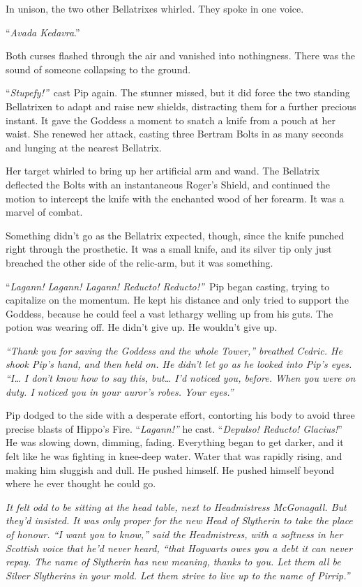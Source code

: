In unison, the two other Bellatrixes whirled. They spoke in one voice.

``\emph{Avada Kedavra}.''

Both curses flashed through the air and vanished into nothingness. There
was the sound of someone collapsing to the ground.

``\emph{Stupefy!''}~cast Pip again. The stunner missed, but it did force
the two standing Bellatrixen to adapt and raise new shields, distracting
them for a further precious instant. It gave the Goddess a moment to
snatch a knife from a pouch at her waist. She renewed her attack,
casting three Bertram Bolts in as many seconds and lunging at the
nearest Bellatrix.

Her target whirled to bring up her artificial arm and wand. The
Bellatrix deflected the Bolts with an instantaneous Roger's Shield, and
continued the motion to intercept the knife with the enchanted wood of
her forearm. It was a marvel of combat.

Something didn't go as the Bellatrix expected, though, since the knife
punched right through the prosthetic. It was a small knife, and its
silver tip only just breached the other side of the relic-arm, but it
was something.

``\emph{Lagann! Lagann! Lagann! Reducto! Reducto!''}~Pip began casting,
trying to capitalize on the momentum. He kept his distance and only
tried to support the Goddess, because he could feel a vast lethargy
welling up from his guts. The potion was wearing off. He didn't give up.
He wouldn't give up.

\emph{``Thank you for saving the Goddess and the whole Tower,'' breathed
Cedric. He shook Pip's hand, and then held on. He didn't let go as he
looked into Pip's eyes. ``I\ldots{} I don't know how to say this,
but\ldots{} I'd noticed you, before. When you were on duty. I noticed
you in your auror's robes. Your eyes.''}

Pip dodged to the side with a desperate effort, contorting his body to
avoid three precise blasts of Hippo's Fire. ``\emph{Lagann!''} he cast.
``\emph{Depulso! Reducto! Glacius!}'' He was slowing down, dimming,
fading. Everything began to get darker, and it felt like he was fighting
in knee-deep water. Water that was rapidly rising, and making him
sluggish and dull. He pushed himself. He pushed himself beyond where he
ever thought he could go.

\emph{It felt odd to be sitting at the head table, next to Headmistress
McGonagall. But they'd insisted. It was only proper for the new Head of
Slytherin to take the place of honour. ``I want you to know,'' said the
Headmistress, with a softness in her Scottish voice that he'd never
heard, ``that Hogwarts owes you a debt it can never repay. The name of
Slytherin has new meaning, thanks to you. Let them all be Silver
Slytherins in your mold. Let them strive to live up to the name of
Pirrip.''}

